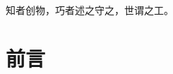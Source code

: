 \documentclass[12pt,a4paper]{book}
\newcommand{\notebody}{
	\chapter*{前言}
	

	
	


}
\begin{document}
	

	\newpage

	\thispagestyle{empty}
	\vspace*{\fill}
	\begin{center}
		{\kaishu\fontsize{18}{28}\selectfont 知者创物，巧者述之守之，世谓之工。}
	\end{center}
	\vfill
	\newpage

	\pagestyle{mainstyle}

	\setcounter{tocdepth}{3}

	\tableofcontents

	\setcounter{page}{0}
	\thispagestyle{empty}
	\newpage
	\notebody
\end{document}
